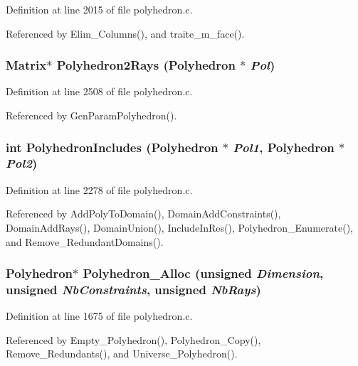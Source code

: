 Definition at line 2015 of file polyhedron.c.

Referenced by Elim\_\-Columns(), and traite\_\-m\_\-face().

\subsubsection{\setlength{\rightskip}{0pt plus 5cm}Matrix$\ast$ Polyhedron2Rays (Polyhedron $\ast$ {\em Pol})}\label{polyhedron_8c_a33}




Definition at line 2508 of file polyhedron.c.

Referenced by Gen\-Param\-Polyhedron().

\subsubsection{\setlength{\rightskip}{0pt plus 5cm}int Polyhedron\-Includes (Polyhedron $\ast$ {\em Pol1}, Polyhedron $\ast$ {\em Pol2})}\label{polyhedron_8c_a29}




Definition at line 2278 of file polyhedron.c.

Referenced by Add\-Poly\-To\-Domain(), Domain\-Add\-Constraints(), Domain\-Add\-Rays(), Domain\-Union(), Include\-In\-Res(), Polyhedron\_\-Enumerate(), and Remove\_\-Redundant\-Domains().

\subsubsection{\setlength{\rightskip}{0pt plus 5cm}Polyhedron$\ast$ Polyhedron\_\-Alloc (unsigned {\em Dimension}, unsigned {\em Nb\-Constraints}, unsigned {\em Nb\-Rays})}\label{polyhedron_8c_a17}




Definition at line 1675 of file polyhedron.c.

Referenced by Empty\_\-Polyhedron(), Polyhedron\_\-Copy(), Remove\_\-Redundants(), and Universe\_\-Polyhedron().

